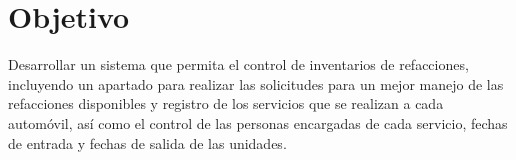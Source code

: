 \section{Objetivo}
Desarrollar un sistema que permita el control de inventarios de refacciones, incluyendo un apartado para realizar las solicitudes para un mejor manejo de las refacciones disponibles y registro de los servicios que se realizan a cada automóvil, así como el control de las personas encargadas de cada servicio, fechas de entrada y fechas de salida de las unidades. 